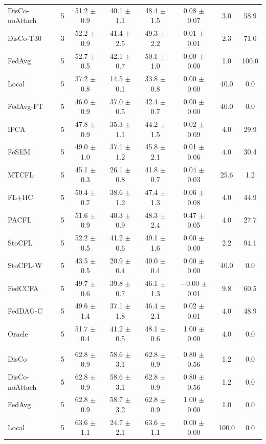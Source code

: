 {\begin{tabular}{l r c c c c c c}
DisCo-noAttach & 5 & 51.2 $\pm$ 0.9 & 40.1 $\pm$ 1.1 & 48.4 $\pm$ 1.5 & 0.08 $\pm$ 0.07 & 3.0 & 58.9 \\
DisCo-T30 & 3 & 52.2 $\pm$ 0.9 & 41.4 $\pm$ 2.5 & 49.3 $\pm$ 2.2 & 0.01 $\pm$ 0.01 & 2.3 & 71.0 \\
FedAvg & 5 & 52.7 $\pm$ 0.5 & 42.1 $\pm$ 0.7 & 50.1 $\pm$ 1.0 & 0.00 $\pm$ 0.00 & 1.0 & 100.0 \\
Local & 5 & 37.2 $\pm$ 0.8 & 14.5 $\pm$ 0.1 & 33.8 $\pm$ 0.8 & 0.00 $\pm$ 0.00 & 40.0 & 0.0 \\
FedAvg-FT & 5 & 46.0 $\pm$ 0.9 & 37.0 $\pm$ 0.5 & 42.4 $\pm$ 0.7 & 0.00 $\pm$ 0.00 & 40.0 & 0.0 \\
IFCA & 5 & 47.8 $\pm$ 0.9 & 35.3 $\pm$ 1.1 & 44.2 $\pm$ 1.5 & 0.02 $\pm$ 0.09 & 4.0 & 29.9 \\
FeSEM & 5 & 49.0 $\pm$ 1.0 & 37.1 $\pm$ 1.2 & 45.8 $\pm$ 2.1 & 0.01 $\pm$ 0.06 & 4.0 & 30.4 \\
MTCFL & 5 & 45.1 $\pm$ 0.3 & 26.1 $\pm$ 0.8 & 41.8 $\pm$ 0.7 & 0.04 $\pm$ 0.03 & 25.6 & 1.2 \\
FL+HC & 5 & 50.4 $\pm$ 0.7 & 38.6 $\pm$ 1.2 & 47.4 $\pm$ 1.3 & 0.06 $\pm$ 0.08 & 4.0 & 44.9 \\
PACFL & 5 & 51.6 $\pm$ 0.9 & 40.3 $\pm$ 0.9 & 48.3 $\pm$ 2.4 & 0.47 $\pm$ 0.05 & 4.0 & 27.7 \\
StoCFL & 5 & 52.2 $\pm$ 0.5 & 41.2 $\pm$ 0.6 & 49.1 $\pm$ 1.6 & 0.00 $\pm$ 0.00 & 2.2 & 94.1 \\
StoCFL-W & 5 & 43.5 $\pm$ 0.5 & 20.9 $\pm$ 0.4 & 40.0 $\pm$ 0.4 & 0.00 $\pm$ 0.00 & 40.0 & 0.0 \\
FedCCFA & 5 & 49.7 $\pm$ 0.6 & 39.8 $\pm$ 0.7 & 46.1 $\pm$ 1.3 & $-$0.00 $\pm$ 0.01 & 9.8 & 60.5 \\
FedDAG-C & 5 & 49.6 $\pm$ 1.4 & 37.1 $\pm$ 1.8 & 46.4 $\pm$ 2.1 & 0.02 $\pm$ 0.01 & 4.0 & 48.9 \\
Oracle & 5 & 51.7 $\pm$ 0.4 & 41.2 $\pm$ 0.5 & 48.1 $\pm$ 0.6 & 1.00 $\pm$ 0.00 & 4.0 & 0.0 \\
\addlinespace
\multicolumn{8}{l}{\textit{FEMNIST}} \\
DisCo & 5 & 62.8 $\pm$ 0.9 & 58.6 $\pm$ 3.1 & 62.8 $\pm$ 0.9 & 0.80 $\pm$ 0.56 & 1.2 & 0.0 \\
DisCo-noAttach & 5 & 62.8 $\pm$ 0.9 & 58.6 $\pm$ 3.1 & 62.8 $\pm$ 0.9 & 0.80 $\pm$ 0.56 & 1.2 & 0.0 \\
FedAvg & 5 & 62.8 $\pm$ 0.9 & 58.7 $\pm$ 3.2 & 62.8 $\pm$ 0.9 & 1.00 $\pm$ 0.00 & 1.0 & 0.0 \\
Local & 5 & 63.6 $\pm$ 1.1 & 24.7 $\pm$ 2.1 & 63.6 $\pm$ 1.1 & 0.00 $\pm$ 0.00 & 100.0 & 0.0 \\

\end{tabular}}
